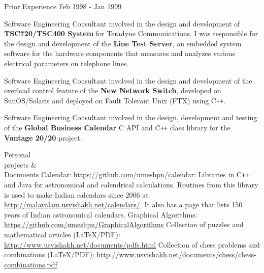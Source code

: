 \documentclass{resume}
\newcommand{\CC}{C{\tt ++}}
\begin{document}
\begin{category}{Prior Experience}
   {Feb 1998 - Jan 1999}

  Software Engineering Consultant involved in the design and development of \textbf{TSC720/TSC400
  System} for Teradyne Communications. I was responsible for the design
  and development of the \textbf{Line Test Server}, an embedded system software for the hardware components
  that measures and analyzes various electrical parameters on telephone
  lines.


  Software Engineering Consultant involved in the design and development of the overload control feature
  of the \textbf{New Network Switch}, developed on SunOS/Solaris and deployed
  on Fault Tolerant Unix (FTX) using \CC{}.


  Software Engineering Consultant involved in the design, development and testing of the
  \textbf{Global Business Calendar} C API and \CC{} class library for
  the \textbf{Vantage 20/20} project.
\iffalse
  \citem{Senior Systems Analyst}, Tata Consultancy Services, Mumbai, India. (May 1993
  -- Jan 1997)

  In addition to the projects mentioned above, I worked in TCS \textbf{Share
  accounting} project. (Jun 1993 -- Apr 1995)

  \citem{Systems Analyst}, Lakme Ltd., Mumbai, India. (Jan 1992 -- May
  1993).

  Worked on various inventory control systems.

  \citem{Computer Programmer}, Supercold Refrigeration Industries,
  Trivandrum, India (Aug 1991 -- Jan 1992).
\fi

\end{category}

\begin{category}{Personal \\ projects \&\\ Documents}
\citembullet Calendar: \url{https://github.com/umeshpn/calendar}: Libraries in \CC{} and Java for astronomical and calendrical calculations.  Routines from this library is used to make Indian calendars since 2006 at \url{http://malayalam.usvishakh.net/calendars/}. It also has a page that lists 150 years of Indian astronomical calendars.
\citembullet Graphical Algorithms: \url{https://github.com/umeshpn/GraphicalAlgorithms}
\citembullet Collection of puzzles and mathematical articles (\LaTeX/PDF): \url{http://www.usvishakh.net/documents/pdfs.html}
\citembullet Collection of chess problems and combinations (\LaTeX/PDF):  \url{http://www.usvishakh.net/documents/chess/chess-combinations.pdf}
\end{category}
\end{document}
